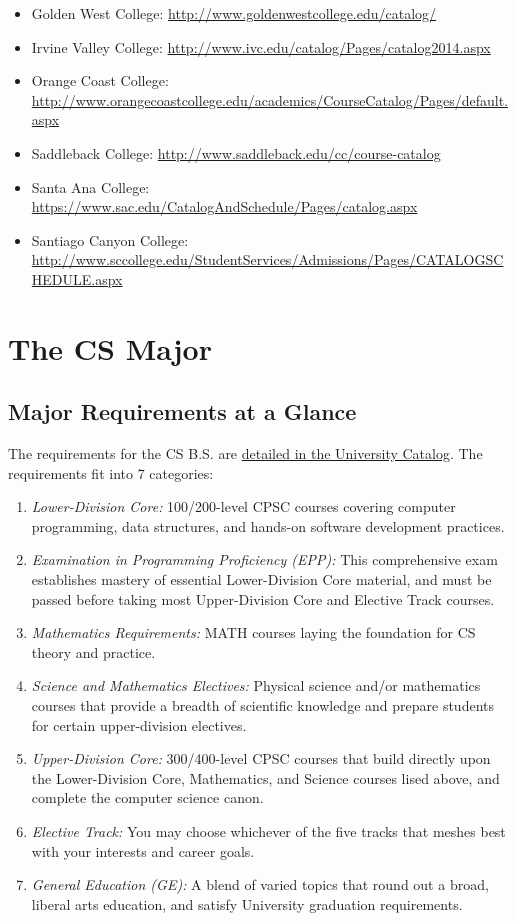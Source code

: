 \documentclass{book}
\begin{document}
\begin{itemize}
\begin{itemize}
    \item Golden West College: \url{http://www.goldenwestcollege.edu/catalog/}
    \item Irvine Valley College: \url{http://www.ivc.edu/catalog/Pages/catalog2014.aspx}
    \item Orange Coast College: \url{http://www.orangecoastcollege.edu/academics/CourseCatalog/Pages/default.aspx}
    \item Saddleback College: \url{http://www.saddleback.edu/cc/course-catalog}
    \item Santa Ana College: \url{https://www.sac.edu/CatalogAndSchedule/Pages/catalog.aspx}
    \item Santiago Canyon College: \url{http://www.sccollege.edu/StudentServices/Admissions/Pages/CATALOGSCHEDULE.aspx}
  \end{itemize}
\end{itemize}

\chapter{The CS Major}

\section{Major Requirements at a Glance}

The requirements for the CS B.S. are \href{http://catalog.fullerton.edu/preview_program.php?catoid=2&poid=537&returnto=137}{detailed in the University Catalog}. The requirements fit into 7 categories:
\begin{enumerate}
\item \emph{Lower-Division Core:} 100/200-level CPSC courses covering computer programming, data structures, and hands-on software development practices.
\item \emph{Examination in Programming Proficiency (EPP):} This comprehensive exam establishes mastery of essential Lower-Division Core material, and must be passed before taking most Upper-Division Core and Elective Track courses. 
\item \emph{Mathematics Requirements:} MATH courses laying the foundation for CS theory and practice.
\item \emph{Science and Mathematics Electives:} Physical science and/or mathematics courses that provide a breadth of scientific knowledge and prepare students for certain upper-division electives.
\item \emph{Upper-Division Core:} 300/400-level CPSC courses that build directly upon the Lower-Division Core, Mathematics, and Science courses lised above, and complete the computer science canon.
\item \emph{Elective Track:} You may choose whichever of the five tracks that meshes best with your interests and career goals.
\item \emph{General Education (GE):} A blend of varied topics that round out a broad, liberal arts education, and satisfy University graduation requirements.
\end{enumerate}
  
\end{document}
